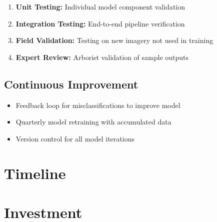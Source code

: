 \documentclass[11pt,a4paper]{article}
\begin{document}
\begin{enumerate}[leftmargin=*]
\item \textbf{Unit Testing:} Individual model component validation
\item \textbf{Integration Testing:} End-to-end pipeline verification
\item \textbf{Field Validation:} Testing on new imagery not used in training
\item \textbf{Expert Review:} Arborist validation of sample outputs
\end{enumerate}

\subsection{Continuous Improvement}

\begin{itemize}[leftmargin=*]
\item Feedback loop for misclassifications to improve model
\item Quarterly model retraining with accumulated data
\item Version control for all model iterations
\end{itemize}

\section{Timeline}

\begin{center}
\end{center}

\section{Investment}
\end{document}

